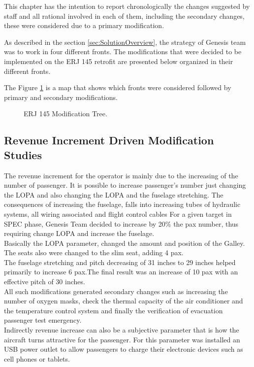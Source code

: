 This chapter has the intention to report chronologically the changes
suggested by staff and all rational involved in each of them, including the secondary changes, these were considered due to a primary modification.

As described in the section \ref{sec:SolutionOverview}, the strategy of Genesis team was to work in four different fronts. The modifications that were decided to be implemented on the ERJ 145 retrofit are presented below organized in their different fronts.

The Figure \ref{fig:ModificationTree} is a map that shows which fronts were considered followed by primary and secondary modifications.

\begin{figure}[H] %
\caption{ERJ 145 Modification Tree.}
\label{fig:ModificationTree}
\end{figure}

\subsection{Revenue Increment Driven Modification Studies}
The revenue increment for the operator is mainly due to the increasing of the number of
passenger. It is possible to increase passenger's number just changing the LOPA and also
changing the LOPA and the fuselage stretching. The consequences of increasing the fuselage, falls into increasing tubes of hydraulic systems, all wiring associated and flight control cables
For a given target in SPEC phase, Genesis Team decided to increase by 20\% the pax number, thus requiring change LOPA and increase the fuselage.
\\Basically the LOPA parameter, changed the amount and position of the Galley. The seats also
were changed to the slim seat, adding 4 pax.
\\The fuselage stretching and pitch decreasing of 31 inches to 29 inches helped primarily to increase 6 pax.The final result was an increase of 10 pax with an effective pitch of 30 inches.
\\All such modifications generated secondary changes such as increasing the number of oxygen masks, check the thermal capacity of the air conditioner and the temperature control system and finally the verification of evacuation passenger test emergency.
\\Indirectly revenue increase can also be a subjective parameter that is how the aircraft turns attractive for the passenger. For this parameter was installed an USB power outlet to allow passengers to charge their electronic devices such as cell phones or tablets.

